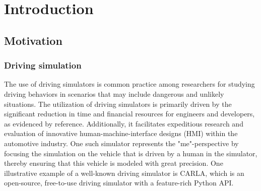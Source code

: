 \chapter{Introduction}\label{ch:introduction}

\section{Motivation}\label{sec:motivation}
    \subsection{Driving simulation}\label{subsec:driving-simulation}
        The use of driving simulators is common practice among researchers for studying driving behaviors in scenarios that may include dangerous and unlikely situations\cite{Wynne2019,That2011}.
        The utilization of driving simulators is primarily driven by the significant reduction in time and financial resources for engineers and developers, as evidenced by reference\cite{That2011}.
        Additionally, it facilitates expeditious research and evaluation of innovative human-machine-interface designs (HMI) within the automotive industry\cite{riegler2023}.
        One such simulator represents the "me"-perspective by focusing the simulation on the vehicle that is driven by a human in the simulator, thereby ensuring that this vehicle is modeled with great precision.
        One illustrative example of a well-known driving simulator is CARLA, which is an open-source, free-to-use driving simulator with a feature-rich Python API\cite{carla2017}.

